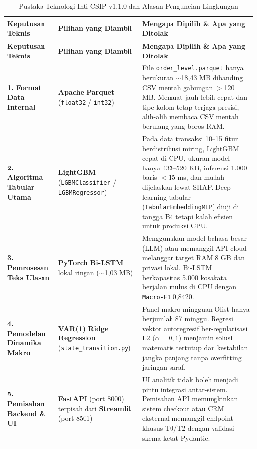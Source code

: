 \documentclass[11pt,a4paper,oneside]{book}
\newcommand{\code}[1]{{\small\nolinkurl{#1}}}
\begin{document}
\begin{longtable}{@{} >{\raggedright\arraybackslash}p{3.4cm} >{\raggedright\arraybackslash}p{3.8cm} >{\raggedright\arraybackslash}p{8.6cm} @{}}
\caption{Pustaka Teknologi Inti CSIP v1.1.0 dan Alasan Penguncian Lingkungan} \\
\toprule
\textbf{Keputusan Teknis} & \textbf{Pilihan yang Diambil} & \textbf{Mengapa Dipilih \& Apa yang Ditolak} \\
\midrule
\endfirsthead
\toprule
\textbf{Keputusan Teknis} & \textbf{Pilihan yang Diambil} & \textbf{Mengapa Dipilih \& Apa yang Ditolak} \\
\midrule
\endhead
\bottomrule
\endfoot
\textbf{1. Format Data Internal} & \textbf{Apache Parquet} (\code{float32} / \code{int32}) & File \code{order_level.parquet} hanya berukuran $\sim$18,43 MB dibanding CSV mentah gabungan $>$120 MB. Memuat jauh lebih cepat dan tipe kolom tetap terjaga presisi, alih-alih membaca CSV mentah berulang yang boros RAM. \\
\textbf{2. Algoritma Tabular Utama} & \textbf{LightGBM} (\code{LGBMClassifier} / \code{LGBMRegressor}) & Pada data transaksi 10--15 fitur berdistribusi miring, LightGBM cepat di CPU, ukuran model hanya 433--520 KB, inferensi 1.000 baris $<$15 ms, dan mudah dijelaskan lewat SHAP. Deep learning tabular (\code{TabularEmbeddingMLP}) diuji di tangga B4 tetapi kalah efisien untuk produksi CPU. \\
\textbf{3. Pemrosesan Teks Ulasan} & \textbf{PyTorch Bi-LSTM} lokal ringan ($\sim$1,03 MB) & Menggunakan model bahasa besar (LLM) atau memanggil API cloud melanggar target RAM 8 GB dan privasi lokal. Bi-LSTM berkapasitas 5.000 kosakata berjalan mulus di CPU dengan \code{Macro-F1} 0,8420. \\
\textbf{4. Pemodelan Dinamika Makro} & \textbf{VAR(1) Ridge Regression} (\code{state_transition.py}) & Panel makro mingguan Olist hanya berjumlah 87 minggu. Regresi vektor autoregresif ber-regularisasi L2 ($\alpha = 0,1$) menjamin solusi matematis tertutup dan kestabilan jangka panjang tanpa overfitting jaringan saraf. \\
\textbf{5. Pemisahan Backend \& UI} & \textbf{FastAPI} (port 8000) terpisah dari \textbf{Streamlit} (port 8501) & UI analitik tidak boleh menjadi pintu integrasi antar-sistem. Pemisahan API memungkinkan sistem checkout atau CRM eksternal memanggil endpoint khusus T0/T2 dengan validasi skema ketat Pydantic. \\
\end{longtable}
\end{document}
